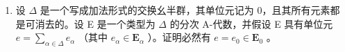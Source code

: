 \BourbakiExercisesSection

\begin{enumerate}
\def\labelenumi{\arabic{enumi}.}
\tightlist
\item
  设 \(\Delta\) 是一个写成加法形式的交换幺半群，其单位元记为 0，且其所有元素都是可消去的。设 E 是一个类型为 \(\Delta\) 的分次 A-代数，并假设 E 具有单位元 \(e = \sum_{\alpha \in \Delta} e_{\alpha}\) （其中 \(e_{\alpha} \in \mathbf{E}_{\alpha}\) ）。证明必然有 \(e = e_0 \in \mathbf{E}_0\) 。
\end{enumerate}
